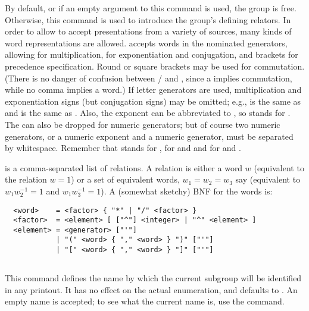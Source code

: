 By default, or if an empty argument to this command is used, the group
  is free.
Otherwise, this command is used to introduce the group's defining
  relators.
In order to allow {\ace} to accept presentations from a variety of
  sources, many kinds of word representations are allowed. 
{\ace} accepts words in the nominated generators, allowing \ttt{*} for
  multiplication, \ttt{\^{}} for exponentiation and conjugation, and
  brackets for precedence specification. 
Round or square brackets may be used for commutation. 
(There is no danger of confusion between \ttt{[a,b]}/ and
  , since a \ttt{,} implies commutation, while no comma implies a
  word.)
If letter generators are used, multiplication and exponentiation signs
  (but  conjugation signs) may be omitted; e.g.,  is the
  same as  and  is the same as .
Also, the exponent  can be abbreviated to \ttt{-},
  so  stands for .
The \ttt{*} can also be dropped for numeric generators; but of course two
  numeric generators, or a numeric exponent and a numeric generator, must
  be separated by whitespace.  
Remember that  stands for ,  for
   and \ttt{[a,b]} and \ttt{[a,b,c]} for  and
  \ttt{[[a,b],c]}.

 is a comma-separated list of relations.
A relation is either a word $w$ (equivalent to the relation $w=1$) or
  a set of equivalent words, $w_1=w_2=w_3$ say (equivalent to
  $w_1w^{-1}_2=1$ and $w_1w^{-1}_3=1$).
A (somewhat sketchy) BNF for the words is:

\bv\begin{verbatim}
  <word>    = <factor> { "*" | "/" <factor> }
  <factor>  = <element> [ ["^"] <integer> | "^" <element> ]
  <element> = <generator> ["'"]
            | "(" <word> { "," <word> } ")" ["'"]
            | "[" <word> { "," <word> } "]" ["'"]
\end{verbatim}\ev

\subsection{}
\label{cmd:subgroup name}

This command defines the name by which the current subgroup will be
  identified in any printout.
It has no effect on the actual enumeration, and defaults to .
An empty name is accepted; to see what the current name is, use the
   command.


